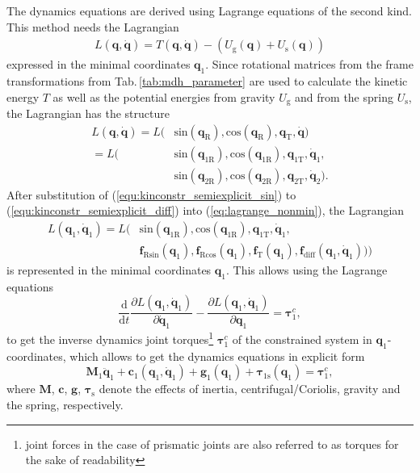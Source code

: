\documentclass[twocolumn,10pt]{IFTOMM}
\newcommand{\bm}[1]{\boldsymbol{#1}}
\begin{document}
The dynamics equations are derived using Lagrange equations of the second kind. This method needs the Lagrangian 
%
\begin{align}
L(\bm{q},\dot{\bm{q}}) = T(\bm{q},\dot{\bm{q}})-(U_{\mathrm{g}}(\bm{q})+U_{\mathrm{s}}(\bm{q}))
\label{equ:Lagrange_energy}
\end{align}
%
expressed in the minimal coordinates $\bm{q}_{1}$. Since rotational matrices from the frame transformations from Tab.\,\ref{tab:mdh_parameter} are used to calculate the kinetic energy $T$ as well as the potential energies from gravity $U_{\mathrm{g}}$ and from the spring $U_{\mathrm{s}}$, the Lagrangian has the structure
%
\begin{align}
L(\bm{q},\dot{\bm{q}}) =L( & \mathrm{sin}  (\bm{q}_{\mathrm{R}}),\mathrm{cos}(\bm{q}_{\mathrm{R}}), \bm{q}_{\mathrm{T}},\dot{\bm{q}}) \\\label{eq:lagrange_nonmin}
=L( & \mathrm{sin}  (\bm{q}_{1\mathrm{R}}),\mathrm{cos}(\bm{q}_{1\mathrm{R}}), \bm{q}_{1\mathrm{T}},\dot{\bm{q}}_{1}, \nonumber \\
& \mathrm{sin}  (\bm{q}_{2\mathrm{R}}),\mathrm{cos}(\bm{q}_{2\mathrm{R}}), \bm{q}_{2\mathrm{T}},\dot{\bm{q}}_{2}).
\end{align}
%
After substitution of (\ref{equ:kinconstr_semiexplicit_sin}) to (\ref{equ:kinconstr_semiexplicit_diff}) into (\ref{eq:lagrange_nonmin}), the Lagrangian 
%
\begin{align}
L(\bm{q}_1,\dot{\bm{q}}_1)=L( & \mathrm{sin} (\bm{q}_{1\mathrm{R}}),\mathrm{cos}(\bm{q}_{1\mathrm{R}}), \bm{q}_{1\mathrm{T}},\dot{\bm{q}}_{1}, \\
 & \bm{f}_{\mathrm{R}\mathrm{sin}}(\bm{q}_1),
\bm{f}_{\mathrm{R}\mathrm{cos}}(\bm{q}_1),
\bm{f}_{\mathrm{T}}(\bm{q}_1),
\bm{f}_{\mathrm{diff}}(\bm{q}_1,\dot{\bm{q}}_1))) \nonumber
\end{align}
%
is represented in the minimal coordinates $\bm{q}_1$.
This allows using the Lagrange equations
%
\begin{equation}
\frac{\mathrm{d}}{\mathrm{d}t}\frac{\partial L(\bm{q}_1,\dot{\bm{q}}_1)}{\partial \dot{\bm{q}}_1} - \frac{\partial L(\bm{q}_1,\dot{\bm{q}}_1)}{\partial \bm{q}_1}= \bm{\tau}^c_1,
\end{equation}
%
to get the inverse dynamics joint torques\footnote{joint forces in the case of prismatic joints are also referred to as torques for the sake of readability} $\bm{\tau}^c_1$ of the constrained system in $\bm{q}_1$-coordinates, which allows to get the dynamics equations in explicit form
%
\begin{equation}
\bm{M}_1\ddot{\bm{q}}_1+\bm{c}_1(\bm{q}_1,\dot{\bm{q}}_1)+\bm{g}_1(\bm{q}_1) + \bm{\tau}_{1\mathrm{s}}(\bm{q}_1) = \bm{\tau}^c_1,
\label{equ:Dyn_MinKoord}
\end{equation}
%
where $\bm{M}$, $\bm{c}$, $\bm{g}$, $\bm{\tau}_{\mathrm{s}}$ denote the effects of inertia, centrifugal/Coriolis, gravity and the spring, respectively.
\end{document}
